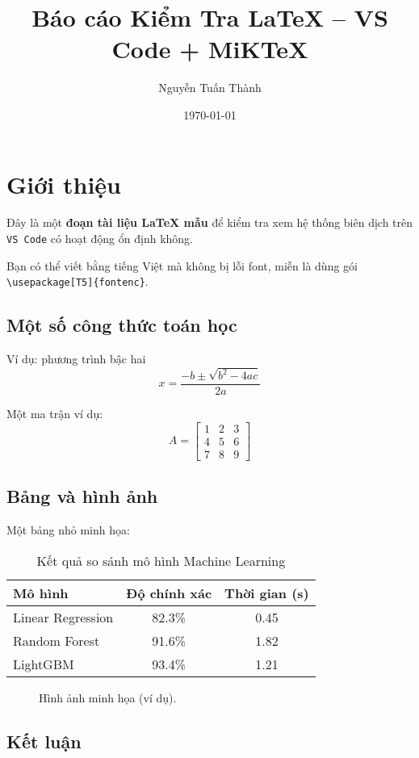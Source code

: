 \documentclass[a4paper,12pt]{report}
\title{Báo cáo Kiểm Tra LaTeX – VS Code + MiKTeX}
\author{Nguyễn Tuấn Thành}
\date{\today}
\begin{document}
\maketitle

\tableofcontents
\newpage

\chapter{Giới thiệu}
Đây là một \textbf{đoạn tài liệu LaTeX mẫu} để kiểm tra xem hệ thống biên dịch trên \texttt{VS Code} có hoạt động ổn định không.

Bạn có thể viết bằng tiếng Việt mà không bị lỗi font, miễn là dùng gói \verb|\usepackage[T5]{fontenc}|.

\section{Một số công thức toán học}
Ví dụ: phương trình bậc hai
\begin{equation}
    x = \frac{-b \pm \sqrt{b^2 - 4ac}}{2a}
\end{equation}

Một ma trận ví dụ:
\[
A = \begin{bmatrix}
1 & 2 & 3\\
4 & 5 & 6\\
7 & 8 & 9
\end{bmatrix}
\]

\section{Bảng và hình ảnh}
Một bảng nhỏ minh họa:

\begin{table}[h]
\centering
\begin{tabular}{lcc}
\toprule
\textbf{Mô hình} & \textbf{Độ chính xác} & \textbf{Thời gian (s)} \\
\midrule
Linear Regression & 82.3\% & 0.45 \\
Random Forest & 91.6\% & 1.82 \\
LightGBM & 93.4\% & 1.21 \\
\bottomrule
\end{tabular}
\caption{Kết quả so sánh mô hình Machine Learning}
\end{table}


\begin{figure}[h]
\centering
\caption{Hình ảnh minh họa (ví dụ).}
\end{figure}

\section{Kết luận}
\end{document}
